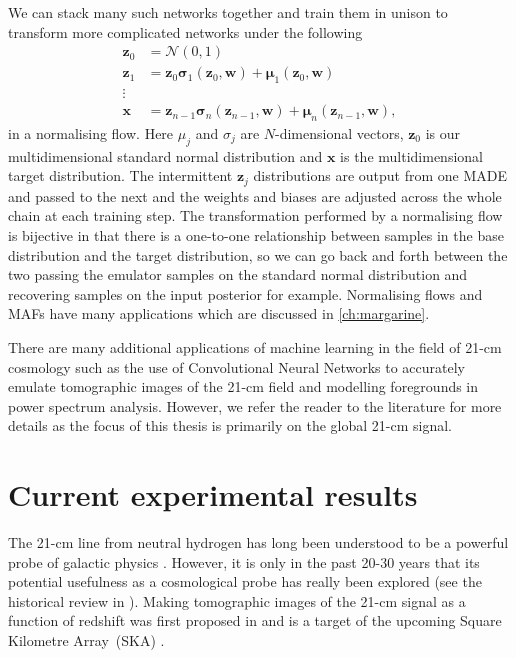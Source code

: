 We can stack many such networks together and train them in unison to transform more complicated networks under the following
\begin{equation}
    \begin{split}
    \mathbf{z}_0 & = \mathcal{N}(0, 1) \\
    \mathbf{z}_1 & = \mathbf{z}_0 \boldsymbol{\sigma}_1(\mathbf{z}_0, \mathbf{w}) + \boldsymbol{\mu}_1(\mathbf{z}_0, \mathbf{w})\\
    \vdots &\\
    \mathbf{x} & = \mathbf{z}_{n-1} \boldsymbol{\sigma}_n(\mathbf{z}_{n-1}, \mathbf{w}) + \boldsymbol{\mu}_n(\mathbf{z}_{n-1}, \mathbf{w}),
    \end{split}
\label{eq:MAF}
\end{equation}
in a normalising flow. Here $\mu_j$ and $\sigma_j$ are $N$-dimensional vectors, $\mathbf{z}_0$ is our multidimensional standard normal distribution and $\mathbf{x}$ is the multidimensional target distribution. The intermittent $\mathbf{z}_j$ distributions are output from one MADE and passed to the next and the weights and biases are adjusted across the whole chain at each training step. The transformation performed by a normalising flow is bijective in that there is a one-to-one relationship between samples in the base distribution and the target distribution, so we can go back and forth between the two passing the emulator samples on the standard normal distribution and recovering samples on the input posterior for example. Normalising flows and MAFs have many applications which are discussed in \cref{ch:margarine}.

There are many additional applications of machine learning in the field of 21-cm cosmology such as the use of Convolutional Neural Networks to accurately emulate tomographic images of the 21-cm field and modelling foregrounds in power spectrum analysis. However, we refer the reader to the literature for more details as the focus of this thesis is primarily on the global 21-cm signal.

\section{Current experimental results}
\label{sec:current_results}

The 21-cm line from neutral hydrogen has long been understood to be a powerful probe of galactic physics \cite{Furlanetto_review_2006, Barkana_review_2016, Mesinger2019}. However, it is only in the past 20-30 years that its potential usefulness as a cosmological probe has really been explored (see the historical review in \cite{Furlanetto_review_2006}). Making tomographic images of the 21-cm signal as a function of redshift was first proposed in \cite{Madau1997} and is a target of the upcoming Square Kilometre Array~(SKA) \cite{Mellema_SKA_2013}.


